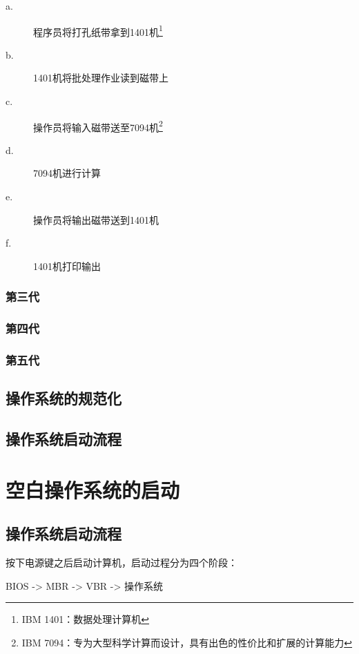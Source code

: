 \documentclass{swfcthesis}
\begin{document}
			\begin{description}
				\item[a.]程序员将打孔纸带拿到1401机\footnote{IBM 1401：数据处理计算机\cite{ibm1401}}
                \item[b.]1401机将批处理作业读到磁带上
                \item[c.]操作员将输入磁带送至7094机\footnote{IBM 7094：专为大型科学计算而设计，具有出色的性价比和扩展的计算能力\cite{ibm7094}}
                \item[d.]7094机进行计算
                \item[e.]操作员将输出磁带送到1401机
                \item[f.]1401机打印输出
			\end{description}
                
		\subsection{第三代}        

		\subsection{第四代}

		\subsection{第五代}

	\section{操作系统的规范化}

	\section{操作系统启动流程}

	
\chapter{空白操作系统的启动}

	\section{操作系统启动流程}

	按下电源键之后启动计算机，启动过程分为四个阶段\cite{hbt}：

		\begin{center}BIOS -> MBR -> VBR -> 操作系统\end{center}
		
\end{document}
